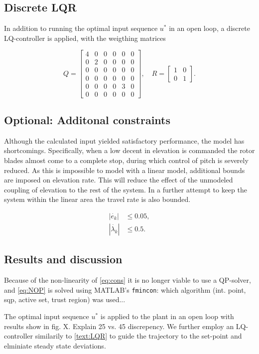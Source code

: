 \subsection{Discrete LQR}
In addition to running the optimal input sequence $u^*$ in an open loop, a discrete LQ-controller is applied, with the weigthing matrices

\begin{equation}
Q = \begin{bmatrix}4&0&0&0&0&0\\0&2&0&0&0&0\\0&0&0&0&0&0\\0&0&0&0&0&0\\0&0&0&0&3&0\\0&0&0&0&0&0\end{bmatrix}, \quad R = \begin{bmatrix}1&0\\0&1\end{bmatrix}.
\end{equation}
\subsection{Optional: Additonal constraints}

Although the calculated input yielded satisfactory performance, the model has shortcomings. Specifically, when a low decent in elevation is commanded the rotor blades almost come to a complete stop, during which control of pitch is severely reduced. As this is impossible to model with a linear model, additional bounds are imposed on elevation rate. This will reduce the effect of the unmodeled coupling of elevation to the rest of the system. In a further attempt to keep the system within the linear area the travel rate is also bounded.

\begin{align*}
	|\dot{e_k}| &\le 0.05, \\
	|\dot{\lambda_k}| &\le 0.5.
\end{align*}
\subsection{Results and discussion}
 Because of the non-linearity of \eqref{eq:cons} it is no longer viable to use a QP-solver, and \eqref{eq:NOP} is solved using MATLAB's \texttt{fmincon}: which algorithm (int. point, sqp, active set, trust region) was used...

The optimal input sequence $u^*$ is applied to the plant in an open loop with results show in fig. X. Explain 25 vs. 45 discrepency. We further employ an LQ-controller similarily to \ref{text:LQR} to guide the trajectory to the set-point and elminiate steady state deviations.

